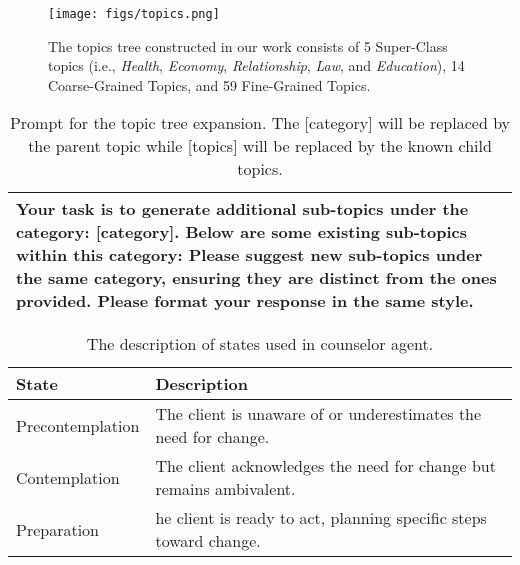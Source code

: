 \begin{figure*}
    \centering
    \texttt{[image: figs/topics.png]}
    \caption{The topics tree constructed in our work consists of 5 Super-Class topics (i.e., {\em Health}, {\em Economy}, {\em Relationship}, {\em Law}, and {\em Education}), 14 Coarse-Grained Topics, and 59 Fine-Grained Topics.}
    \label{fig:topic tree}
\end{figure*}


\begin{table*}[tb]
\begin{tabularx}{\textwidth}{X}
\toprule
{\sf \footnotesize
Your task is to generate additional sub-topics under the category: [category]. Below are some existing sub-topics within this category: \newline [topics] \newline \newline Please suggest new sub-topics under the same category, ensuring they are distinct from the ones provided. Please format your response in the same style.}
\\ \bottomrule
\end{tabularx}
\caption{Prompt for the topic tree expansion. The [category] will be replaced by the parent topic while [topics] will be replaced by the known child topics.}
\label{tab:topic expansion}
\end{table*}

\begin{table*}[tb]
\centering
\begin{tabularx}{\textwidth}{lX}
\toprule
{\bf State}            & {\bf Description }                                           \\ \midrule
Precontemplation & The client is unaware of or underestimates the need for change.       \\ \hline
Contemplation    & The client acknowledges the need for change but remains ambivalent.   \\ \hline
Preparation      & he client is ready to act, planning specific steps toward change.
\\ \bottomrule
\end{tabularx}
\caption{The description of states used in counselor agent.}
\label{tab:counselor state description}
\end{table*}

